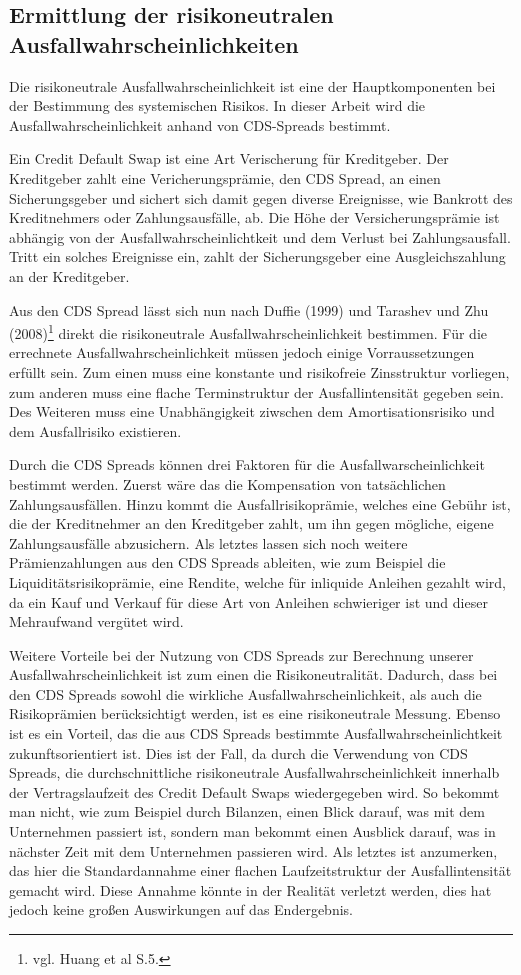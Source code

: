 \documentclass[a4paper,12pt]{scrartcl}
\begin{document}
\subsection{Ermittlung der risikoneutralen Ausfallwahrscheinlichkeiten}
Die risikoneutrale Ausfallwahrscheinlichkeit ist eine der Hauptkomponenten bei der Bestimmung des systemischen Risikos. In dieser Arbeit wird die Ausfallwahrscheinlichkeit anhand von CDS-Spreads bestimmt.

Ein Credit Default Swap ist eine Art Verischerung für Kreditgeber. Der Kreditgeber zahlt eine Vericherungsprämie, den CDS Spread, an einen Sicherungsgeber und sichert sich damit gegen diverse Ereignisse, wie Bankrott des Kreditnehmers oder Zahlungsausfälle, ab. Die Höhe der Versicherungsprämie ist abhängig von der Ausfallwahrscheinlichtkeit und dem Verlust bei Zahlungsausfall.  Tritt ein solches Ereignisse ein, zahlt der Sicherungsgeber eine Ausgleichszahlung an der Kreditgeber.

Aus den CDS Spread lässt sich nun nach Duffie (1999) und Tarashev und Zhu (2008)\footnote{vgl. Huang et al S.5.} direkt die risikoneutrale Ausfallwahrscheinlichkeit bestimmen. Für die errechnete Ausfallwahrscheinlichkeit müssen jedoch einige Vorraussetzungen erfüllt sein. Zum einen muss eine konstante und risikofreie Zinsstruktur vorliegen, zum anderen muss eine flache Terminstruktur der Ausfallintensität gegeben sein. Des Weiteren muss eine Unabhängigkeit ziwschen dem Amortisationsrisiko und dem Ausfallrisiko existieren. 

Durch die CDS Spreads können drei Faktoren für die Ausfallwarscheinlichkeit bestimmt werden. Zuerst wäre das die Kompensation von tatsächlichen Zahlungsausfällen. Hinzu kommt die Ausfallrisikoprämie, welches eine Gebühr ist, die der Kreditnehmer an den Kreditgeber zahlt, um ihn gegen mögliche, eigene Zahlungsausfälle abzusichern. Als letztes lassen sich noch weitere Prämienzahlungen aus den CDS Spreads ableiten, wie zum Beispiel die Liquiditätsrisikoprämie, eine Rendite, welche für inliquide Anleihen gezahlt wird, da ein Kauf und Verkauf für diese Art von Anleihen schwieriger ist und dieser Mehraufwand vergütet wird.

Weitere Vorteile bei der Nutzung von CDS Spreads zur Berechnung unserer Ausfallwahrscheinlichkeit ist zum einen die Risikoneutralität. Dadurch, dass bei den CDS Spreads sowohl die wirkliche Ausfallwahrscheinlichkeit, als auch die Risikoprämien berücksichtigt werden, ist es eine risikoneutrale Messung.
Ebenso ist es ein Vorteil, das die aus CDS Spreads bestimmte Ausfallwahrscheinlichtkeit zukunftsorientiert ist. Dies ist der Fall, da durch die Verwendung von CDS Spreads, die durchschnittliche risikoneutrale Ausfallwahrscheinlichkeit innerhalb der Vertragslaufzeit des Credit Default Swaps wiedergegeben wird. 
So bekommt man nicht, wie zum Beispiel durch Bilanzen, einen Blick darauf, was mit dem Unternehmen passiert ist, sondern man bekommt einen Ausblick darauf, was in nächster Zeit mit dem Unternehmen passieren wird.
Als letztes ist anzumerken, das hier die Standardannahme einer flachen Laufzeitstruktur der Ausfallintensität gemacht wird. Diese Annahme könnte in der Realität verletzt werden, dies hat jedoch keine großen Auswirkungen auf das Endergebnis.
\end{document}
